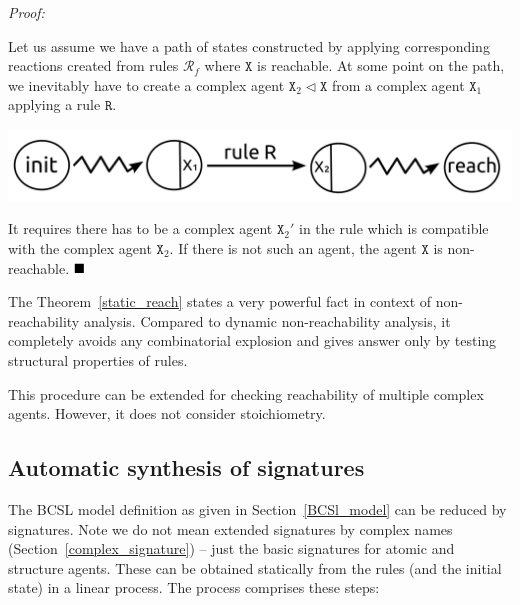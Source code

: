 \documentclass[12pt, twoside]{fithesis2} %
\newenvironment{proof}{\noindent\emph{Proof:~ }\nopagebreak \begin{itshape}}{\end{itshape}\bigskip}
\newcommand*{\QEDA}{\hfill\ensuremath{\blacksquare}}%
\begin{document}
\begin{proof}
Let us assume we have a path of states constructed by applying corresponding reactions created from rules $\mathcal{R}_f$ where $\mathtt{X}$ is reachable. At some point on the path, we inevitably have to create a complex agent $\mathtt{X}_2 \lhd \mathtt{X}$ from a complex agent $\mathtt{X}_1$ applying a rule $\mathtt{R}$. 

\begin{center}
\includegraphics[scale=0.15]{pics/static_reach}
\end{center}

It requires there has to be a complex agent $\mathtt{X}_2'$ in the rule which is compatible with the complex agent $\mathtt{X}_2$. If there is not such an agent, the agent $\mathtt{X}$ is non-reachable. $\QEDA$
\end{proof}

The Theorem~\ref{static_reach} states a very powerful fact in context of non-reachability analysis. Compared to dynamic non-reachability analysis, it completely avoids any combinatorial explosion and gives answer only by testing structural properties of rules.

This procedure can be extended for checking reachability of multiple complex agents. However, it does not consider stoichiometry.

\subsection{Automatic synthesis of signatures}

The BCSL model definition as given in Section~\ref{BCSl_model} can be reduced by signatures. Note we do not mean extended signatures by complex names (Section~\ref{complex_signature}) -- just the basic signatures for atomic and structure agents. These can be obtained statically from the rules (and the initial state) in a  linear process. The process comprises these steps:
\end{document}
